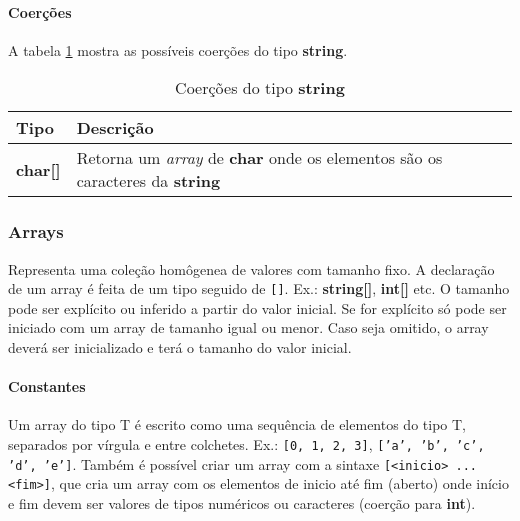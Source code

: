 \paragraph{Coerções} A tabela \ref{tab:coercoes-string} mostra as possíveis coerções do tipo \textbf{string}.
\begin{table}[!h]
    \begin{tabular}{@{}ll@{}}
        \toprule
        Tipo            & Descrição                                                                                         \\ \midrule
        \textbf{char[]} & Retorna um \textit{array} de \textbf{char} onde os elementos são os caracteres da \textbf{string} \\ \bottomrule
    \end{tabular}
    \caption{Coerções do tipo \textbf{string}}
    \label{tab:coercoes-string}
\end{table}

\subsubsection{Arrays}
Representa uma coleção homôgenea de valores com tamanho fixo. A declaração de um array é feita de um tipo seguido de \texttt{[]}. Ex.: \textbf{string[]}, \textbf{int[]} etc. O tamanho pode ser explícito ou inferido a partir do valor inicial. Se for explícito só pode ser iniciado com um array de tamanho igual ou menor. Caso seja omitido, o array deverá ser inicializado e terá o tamanho do valor inicial.

\paragraph{Constantes} Um array do tipo T é escrito como uma sequência de elementos do tipo T, separados por vírgula e entre colchetes. Ex.: \texttt{[0, 1, 2, 3]}, \texttt{['a', 'b', 'c', 'd', 'e']}. Também é possível criar um array com a sintaxe \texttt{[<inicio> ... <fim>]}, que cria um array com os elementos de inicio até fim (aberto) onde início e fim devem ser valores de tipos numéricos ou caracteres (coerção para \textbf{int}).

